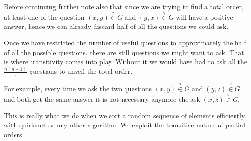 Before continuing further note also that since we are trying to find a total order, at least one of the question $(x, y) \stackrel{?}{\in} G$ and $(y, x) \stackrel{?}{\in} G$ will have a positive answer, hence we can already discard half of all the questions we could ask.

Once we have restricted the number of useful questions to approximately the half of all the possible questions, there are still  questions we might want to ask. That is where transitivity comes into play. Without it we would have had to ask all the $\frac{n (n-1)}{2}$ questions to unveil the total order.

For example, every time we ask the two questions $(x, y) \stackrel{?}{\in} G$ and $(y, z) \stackrel{?}{\in} G$ and both get the same answer it is not necessary anymore the ask $(x, z) \stackrel{?}{\in} G$.

This is really what we do when we sort a random sequence of elements efficiently with quicksort or any other algorithm. We exploit the transitive nature of partial orders.